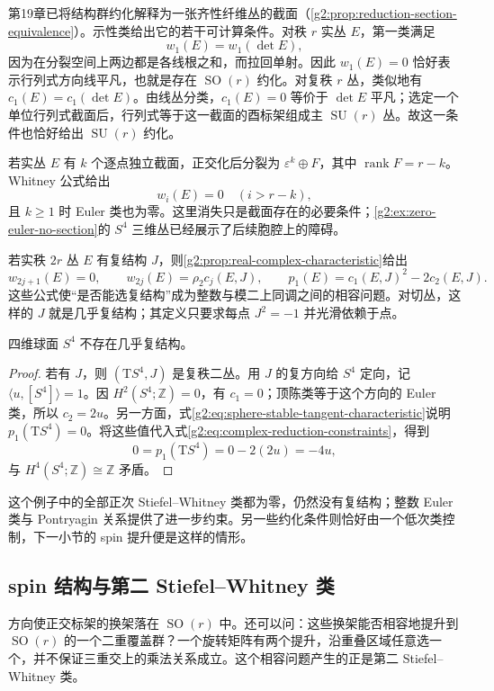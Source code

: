 第19章已将结构群约化解释为一张齐性纤维丛的截面（\cref{g2:prop:reduction-section-equivalence}）。示性类给出它的若干可计算条件。对秩 \(r\) 实丛 \(E\)，第一类满足
\[
	w_1(E)=w_1(\det E),
\]
因为在分裂空间上两边都是各线根之和，而拉回单射。因此 \(w_1(E)=0\) 恰好表示行列式方向线平凡，也就是存在 \(\operatorname{SO}(r)\) 约化。对复秩 \(r\) 丛，类似地有 \(c_1(E)=c_1(\det E)\)。由线丛分类，\(c_1(E)=0\) 等价于 \(\det E\) 平凡；选定一个单位行列式截面后，行列式等于这一截面的酉标架组成主 \(\operatorname{SU}(r)\) 丛。故这一条件也恰好给出 \(\operatorname{SU}(r)\) 约化。

\ProseParagraphBreak

若实丛 \(E\) 有 \(k\) 个逐点独立截面，正交化后分裂为 \(\varepsilon^k\oplus F\)，其中 \(\operatorname{rank}F=r-k\)。Whitney 公式给出
\[
	w_i(E)=0\quad(i>r-k),
\]
且 \(k\ge1\) 时 Euler 类也为零。这里消失只是截面存在的必要条件；\cref{g2:ex:zero-euler-no-section}的 \(S^4\) 三维丛已经展示了后续胞腔上的障碍。

若实秩 \(2r\) 丛 \(E\) 有复结构 \(J\)，则\cref{g2:prop:real-complex-characteristic}给出
\begin{equation}\label{g2:eq:complex-reduction-constraints}
	w_{2j+1}(E)=0,\qquad w_{2j}(E)=\rho_2c_j(E,J),\qquad
	p_1(E)=c_1(E,J)^2-2c_2(E,J).
\end{equation}
这些公式使“是否能选复结构”成为整数与模二上同调之间的相容问题。对切丛，这样的 \(J\) 就是几乎复结构；其定义只要求每点 \(J^2=-1\) 并光滑依赖于点。

\begin{proposition}\label{g2:prop:sphere-four-no-almost-complex}
	四维球面 \(S^4\) 不存在几乎复结构。
\end{proposition}
\begin{proof}
	若有 \(J\)，则 \((\mathrm TS^4,J)\) 是复秩二丛。用 \(J\) 的复方向给 \(S^4\) 定向，记 \(\langle u,[S^4]\rangle=1\)。因 \(H^2(S^4;\mathbb Z)=0\)，有 \(c_1=0\)；顶陈类等于这个方向的 Euler 类，所以 \(c_2=2u\)。另一方面，式\eqref{g2:eq:sphere-stable-tangent-characteristic}说明 \(p_1(\mathrm TS^4)=0\)。将这些值代入式\eqref{g2:eq:complex-reduction-constraints}，得到
	\[
		0=p_1(\mathrm TS^4)=0-2(2u)=-4u,
	\]
	与 \(H^4(S^4;\mathbb Z)\cong\mathbb Z\) 矛盾。
\end{proof}

这个例子中的全部正次 Stiefel--Whitney 类都为零，仍然没有复结构；整数 Euler 类与 Pontryagin 关系提供了进一步约束。另一些约化条件则恰好由一个低次类控制，下一小节的 spin 提升便是这样的情形。

\subsection{spin 结构与第二 Stiefel–Whitney 类}
\label{g2:subsec:2104:04}
方向使正交标架的换架落在 \(\operatorname{SO}(r)\) 中。还可以问：这些换架能否相容地提升到 \(\operatorname{SO}(r)\) 的一个二重覆盖群？一个旋转矩阵有两个提升，沿重叠区域任意选一个，并不保证三重交上的乘法关系成立。这个相容问题产生的正是第二 Stiefel--Whitney 类。


